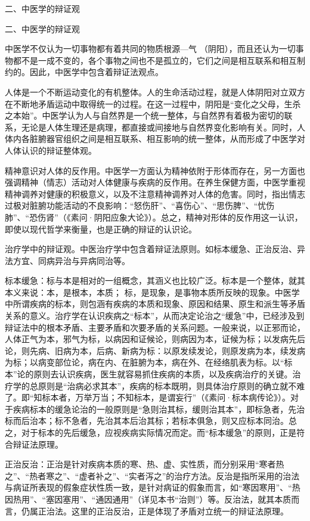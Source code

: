 \documentclass[a4paper,12pt,UTF8,twoside]{ctexbook}
\begin{document}
二、中医学的辩证观

二、中医学的辩证观

中医学不仅认为一切事物都有着共同的物质根源—气 （阴阳），而且还认为一切事物都不是一成不变的，各个事物之间也不是孤立的，它们之间是相互联系和相互制约的。因此，中医学中包含着辩证法观点。

人体是一个不断运动变化的有机整体。人的生命活动过程，就是人体阴阳对立双方在不断地矛盾运动中取得统一的过程。在这一过程中，阴阳是“变化之父母，生杀之本始”。中医学认为人与自然界是一个统一整体，与自然界有着极为密切的联系，无论是人体生理还是病理，都直接或间接地与自然界变化影响有关。同时，人体内各脏腑器官组织之间是相互联系、相互影响的统一整体，从而形成了中医学对人体认识的辩证整体观。

精神意识对人体的反作用。中医学一方面认为精神依附于形体而存在，另一方面也强调精神（情志）活动对人体健康与疾病的反作用。在养生保健方面，中医学重视精神调养对健康的积极意义，以及不注意精神调养对人体的危害。同时，指出情志过极对脏腑功能活动的不良影响：“怒伤肝”、“喜伤心”、“思伤脾”、“忧伤肺”、“恐伤肾”（《素问·阴阳应象大论》）。总之，精神对形体的反作用这一认识，即使以现代哲学来衡量，也是正确的辩证的认识论。

治疗学中的辩证观。中医治疗学中包含着辩证法原则。如标本缓急、正治反治、异法方宜、同病异治与异病同治等。

标本缓急：标与本是相对的一组概念，其涵义也比较广泛。标本是一个整体，就其本义来说：本，是根本，本质； 标，是现象，是事物本质所反映的现象。中医学中所谓疾病的标本，则包涵有疾病的本质和现象、原因和结果、原生和派生等矛盾关系的意义。治疗学在认识疾病之“标本”，从而决定论治之“缓急”中，已经涉及到辩证法中的根本矛盾、主要矛盾和次要矛盾的关系问题。一般来说，以正邪而论，人体正气为本，邪气为标，以病因和证候论，则病因为本，证候为标；以发病先后论，则先病、旧病为本，后病、新病为标：以原发续发论，则原发病为本，续发病为标；以病变部位论，病在内、在脏腑为本，病在外、在经络肌表为标。以“标本”论的原则去认识疾病，医生就容易抓住疾病的本质，以及疾病治疗的关键。治疗学的总原则是“治病必求其本”，疾病的标本既明，则具体治疗原则的确立就不难了。即“知标本者，万举万当；不知标本，是谓妄行”（《素问·标本病传论》）。对于疾病标本的缓急论治的一般原则是“急则治其标，缓则治其本”，即标急者，先治标而后治本；标不急者，先治其本后治其标；若标本俱急，则又应标本同治。总之，对于标本的先后缓急，应视疾病实际情况而定。而“标本缓急”的原则，正是符合辩证法原理。

正治反治：正治是针对疾病本质的寒、热、虚、实性质，而分别采用“寒者热之”、“热者寒之”、“虚者补之”、“实者泻之”的治疗方法。反治是指所采用的治法与病证所表现的假象症状性质一致，是针对病证的假象而言，如“寒因寒用”、“热因热用”、“塞因塞用”、“通因通用”（详见本书“治则”）等。反治法，就其本质而言，仍属正治法。这里的正治反治，正是体现了矛盾对立统一的辩证法原理。
\end{document}
